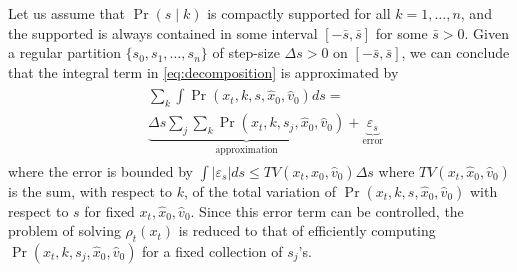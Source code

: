 \documentclass[letterpaper,10pt,conference]{ieeeconf}
\begin{document}
Let us assume that $\Pr(s \mid k)$ is compactly supported for all $k = 1,\dots,n$, and the supported is always contained
in some interval $[ - \bar{s} , \bar{s} ]$ for some $\bar{s} > 0$.
Given a regular partition $\{ s_0, s_1, \dots, s_n \}$ of step-size $\Delta s > 0$ on $[-\bar{s}, \bar{s}]$,  we can conclude that the integral term in \eqref{eq:decomposition} is approximated by
\begin{align}
	\begin{split}
	&\sum_{k} \int \Pr( x_t, k , s , \hat{x}_0, \hat{v}_0 ) ds = \\
	 &\underbrace{\Delta s \sum_{j} \sum_{k} \Pr( x_t, k , s_j , \hat{x}_0, \hat{v}_0)}_{\text{approximation}}
	  +
	  \underbrace{\varepsilon_s}_{\text{error}}
	 \end{split} \label{eq:approximation 0}
\end{align}
where the error is bounded by $\int| \varepsilon_s | ds \leq  TV(x_t, \hat{x}_0, \hat{v}_0) \Delta s$
where $TV(x_t, \hat{x}_0, \hat{v}_0)$ is the sum, with respect to $k$, of the total variation of $\Pr( x_t, k , s, \hat{x}_0, \hat{v}_0 )$ with respect to $s$ for fixed $x_t, \hat{x}_0, \hat{v}_0$.
Since this error term can be controlled, the problem of solving $\rho_t(x_t)$ is reduced to that of efficiently computing $ \Pr( x_t, k , s_j, \hat{x}_0, \hat{v}_0)$
for a fixed collection of $s_j$'s.
\end{document}
